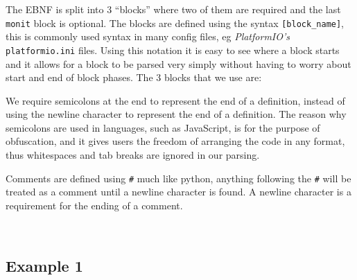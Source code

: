 \documentclass[10pt]{article}
\begin{document}
\noi The EBNF is split into 3 “blocks” where two of them are required and the last \texttt{monit} block is optional. The blocks are defined using the syntax \texttt{[block\_name]}, this is commonly used syntax in many config files, eg \emph{PlatformIO's} \texttt{platformio.ini} files. Using this notation it is easy to see where a block starts and it allows for a block to be parsed very simply without having to worry about start and end of block phases. The 3 blocks that we use are:


We require semicolons at the end to represent the end of a definition, instead of using the newline character to represent the end of a definition. The reason why semicolons are used in languages, such as JavaScript, is for the purpose of obfuscation, and it gives users the freedom of arranging the code in any format, thus whitespaces and tab breaks are ignored in our parsing.

Comments are defined using \texttt{\#} much like python, anything following the \texttt{\#} will be treated as a comment until a newline character is found. A newline character is a requirement for the ending of a comment.

\

\subsection{Example 1}
\end{document}
